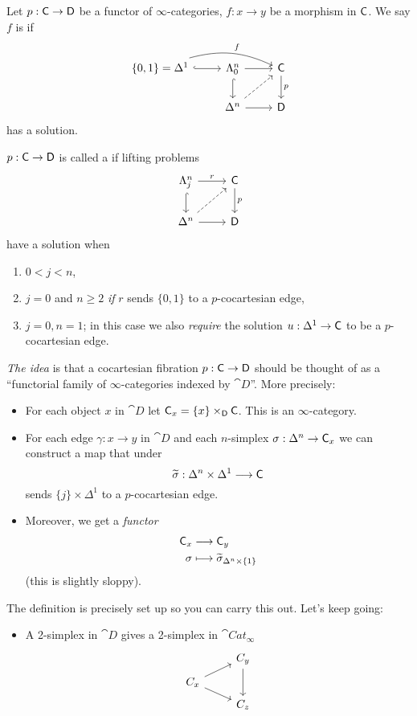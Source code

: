 \begin{definition}
	Let $p:\C\to \cat{D}$ be a functor of $\infty$-categories, $f:x\to y$ be a morphism in $\mathsf{C}$.  We say $f$ is  if
	\[
	\begin{tikzcd}
		\{0,1\} = \Delta^{1} \ar[r,hook] \ar[rr,bend left=20, "f"] & \Lambda_0^{n} \ar[r] \ar[d, hook] & \C \ar[d,"p"] \\
									   & \Delta^{n} \ar[r] \ar[ur,dashed] & \cat{D}
	\end{tikzcd}
	\] 
	has a solution.
\end{definition}
\begin{definition}
	$p:\C\to \cat{D}$ is called a  if lifting problems
	\[
	\begin{tikzcd}
		\Lambda_j^{n} \ar[r,"r"] \ar[d,hook] & \C \ar[d,"p"] \\
		\Delta^{n} \ar[r] \ar[ur,dashed] & \cat{D}
	\end{tikzcd}
	\] 
	have a solution when
	\begin{enumerate}[(1)]
		\item $0<j<n$,
		\item $j=0$ and $n\ge 2$ \emph{if} $r$ sends $\{0,1\} $ to a $p$-cocartesian edge,
		\item $j=0,n=1$; in this case we also \emph{require} the solution $u:\Delta^{1}\to \C$ to be a $p$-cocartesian edge.
	\end{enumerate}
\end{definition}
\emph{The idea} is that a cocartesian fibration $p:\C\to \cat{D}$ should be thought of as a ``functorial family of $\infty$-categories indexed by $\cat{D}$''. More precisely:
\begin{itemize}
	\item For each object $x$ in $\cat{D}$ let $\mathsf{C}_x = \{x\}\times_{\mathsf{D}}\mathsf{C}$. This is an $\infty$-category.
	\item For each edge $\gamma:x\to y$ in $\cat{D}$ and each $n$-simplex $\sigma:\Delta^{n}\to \C_x$ we can construct a map that under
		\[
			\wt{\sigma}: \Delta^{n}\times \Delta^{1} \to \C
		\] 
		sends $\{j\} \times \Delta^{1}$ to a $p$-cocartesian edge.
	\item Moreover, we get a \emph{functor}
		\begin{align*}
			\mathsf{C}_x &\longrightarrow \mathsf{C}_y \\
			\sigma &\longmapsto \widetilde{\sigma}_{\Delta^{n}\times \{1\} }
		\end{align*}
		(this is slightly sloppy).
\end{itemize}
The definition is precisely set up so you can carry this out. Let's keep going:
\begin{itemize}
	\item A 2-simplex in $\cat{D}$ gives a 2-simplex in $\cat{Cat}_\infty$ 
		\[
		\begin{tikzcd}[row sep=tiny]
			& C_y \ar[dd] \\
			C_x \ar[ur] \ar[dr] \\
			& C_z
		\end{tikzcd}
		\] 
\end{itemize}


